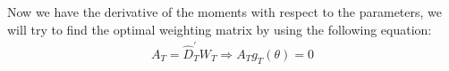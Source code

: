 \begin{enumerate}[(a)]
        Now we have the derivative of the moments with respect to the parameters, we will try to find the optimal weighting matrix by using the following equation:
        \begin{gather*}
          A_T = \hat{D}_T^{'}W_T \Rightarrow A_T g_T(\theta) = 0 \\
        \end{gather*}
      

\end{enumerate}
